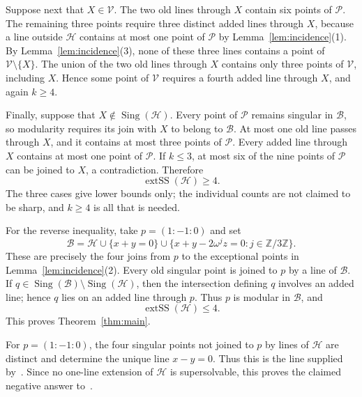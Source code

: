 \documentclass[11pt]{amsart}
\newcommand{\Sing}{\operatorname{Sing}}
\newcommand{\extSS}{\operatorname{extSS}}
\begin{document}
Suppose next that $X\in\mathcal V$. The two old lines through $X$
contain six points of $\mathcal P$. The remaining three points require
three distinct added lines through $X$, because a line outside
$\mathcal H$ contains at most one point of $\mathcal P$ by
Lemma~\ref{lem:incidence}(1). By Lemma~\ref{lem:incidence}(3), none of
these three lines contains a point of $\mathcal V\setminus\{X\}$. The
union of the two old lines through $X$ contains only three points of
$\mathcal V$, including $X$. Hence some point of $\mathcal V$ requires
a fourth added line through $X$, and again $k\ge4$.

Finally, suppose that $X\notin\Sing(\mathcal H)$. Every point of
$\mathcal P$ remains singular in $\mathcal B$, so modularity requires
its join with $X$ to belong to $\mathcal B$. At most one old line
passes through $X$, and it contains at most three points of
$\mathcal P$. Every added line through $X$ contains at most one point
of $\mathcal P$. If $k\le3$, at most six of the nine points of
$\mathcal P$ can be joined to $X$, a contradiction. Therefore
\[
\extSS(\mathcal H)\ge4.
\]
The three cases give lower bounds only; the individual counts are not
claimed to be sharp, and $k\ge4$ is all that is needed.

For the reverse inequality, take $p=(1:-1:0)$ and set
\[
\mathcal B=\mathcal H
\cup\{x+y=0\}
\cup\{x+y-2\omega^jz=0:j\in\mathbb Z/3\mathbb Z\}.
\]
These are precisely the four joins from $p$ to the exceptional points
in Lemma~\ref{lem:incidence}(2). Every old singular point is joined to
$p$ by a line of $\mathcal B$. If
$q\in\Sing(\mathcal B)\setminus\Sing(\mathcal H)$, then the
intersection defining $q$ involves an added line; hence $q$ lies on an
added line through $p$. Thus $p$ is modular in $\mathcal B$, and
\[
\extSS(\mathcal H)\le4.
\]
This proves Theorem~\ref{thm:main}.

For $p=(1:-1:0)$, the four singular points not joined to $p$ by lines
of $\mathcal H$ are distinct and determine the unique line $x-y=0$.
Thus this is the line supplied by~\cite[Theorem~1.12(2)]{Dimca}.
Since no one-line extension of $\mathcal H$ is supersolvable, this
proves the claimed negative answer to~\cite[Remark~2.3]{DKP}.
\end{document}
